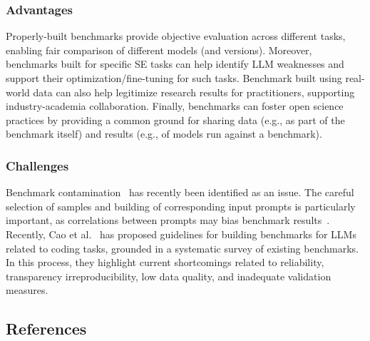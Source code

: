 \subsubsection{Advantages}

Properly-built benchmarks provide objective evaluation across different tasks, enabling fair comparison of different models (and versions).
Moreover, benchmarks built for specific SE tasks can help identify LLM weaknesses and support their optimization/fine-tuning for such tasks.
Benchmark built using real-world data can also help legitimize research results for practitioners, supporting industry-academia collaboration.
Finally, benchmarks can foster open science practices by providing a common ground for sharing data (e.g., as part of the benchmark itself) and results (e.g., of models run against a benchmark).

\subsubsection{Challenges}

Benchmark contamination~\cite{DBLP:journals/corr/abs-2410-16186} has recently been identified as an issue.
The careful selection of samples and building of corresponding input prompts is particularly important, as correlations between prompts may bias benchmark results~\cite{DBLP:conf/acl/SiskaMAB24}.
Recently, Cao et al.~\cite{cao2025should} has proposed guidelines for building benchmarks for LLMs related to coding tasks, grounded in a systematic survey of existing benchmarks. 
In this process, they highlight current shortcomings related to reliability, transparency irreproducibility, low data quality, and inadequate validation measures.


\subsection{References}





